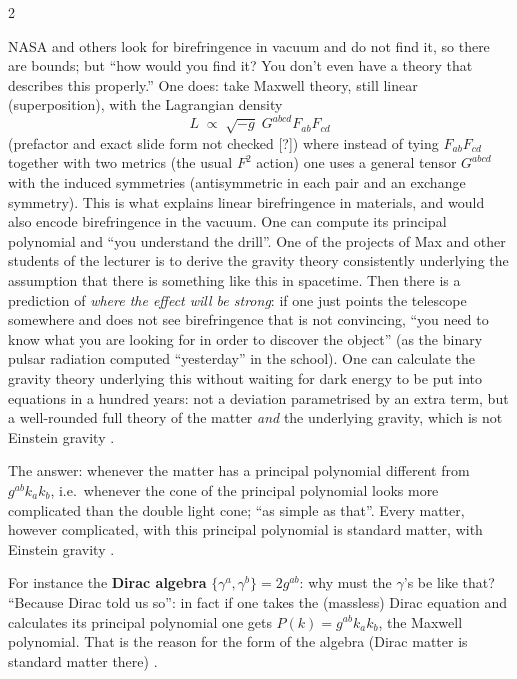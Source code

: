 \begin{paracol}{2}
\begin{example}\label{ex:c26-biref}
NASA and others look for birefringence in vacuum and do not find it, so there are bounds; but ``how would you find it? You don't even have a theory that describes this properly.'' One does: take Maxwell theory, still linear (superposition), with the Lagrangian density
\[
  L\;\propto\;\sqrt{-g}\;G^{abcd}F_{ab}F_{cd}
\]
(prefactor and exact slide form not checked [?]) 
where instead of tying $F_{ab}F_{cd}$ together with two metrics (the usual $F^2$ action) one uses a general tensor $G^{abcd}$ with the induced symmetries (antisymmetric in each pair and an exchange symmetry). This is what explains linear birefringence in materials, and would also encode birefringence in the vacuum. One can compute its principal polynomial and ``you understand the drill''. One of the projects of Max and other students of the lecturer is to derive the gravity theory consistently underlying the assumption that there is something like this in spacetime. Then there is a prediction of \emph{where the effect will be strong}: if one just points the telescope somewhere and does not see birefringence that is not convincing, ``you need to know what you are looking for in order to discover the object'' (as the binary pulsar radiation computed ``yesterday'' in the school). One can calculate the gravity theory underlying this without waiting for dark energy to be put into equations in a hundred years: not a deviation parametrised by an extra term, but a well-rounded full theory of the matter \emph{and} the underlying gravity, which is not Einstein gravity .
\end{example}

\begin{remark}\label{rem:c26-which}
The answer: whenever the matter has a principal polynomial different from $g^{ab}k_ak_b$, i.e.\ whenever the cone of the principal polynomial looks more complicated than the double light cone; ``as simple as that''. Every matter, however complicated, with this principal polynomial is standard matter, with Einstein gravity .
\end{remark}

For instance the \textbf{Dirac algebra} $\{\gamma^a,\gamma^b\}=2g^{ab}$: why must the $\gamma$'s be like that? ``Because Dirac told us so'': in fact if one takes the (massless) Dirac equation and calculates its principal polynomial one gets $P(k)=g^{ab}k_ak_b$, the Maxwell polynomial. That is the reason for the form of the algebra (Dirac matter is standard matter there) .


\end{paracol}
